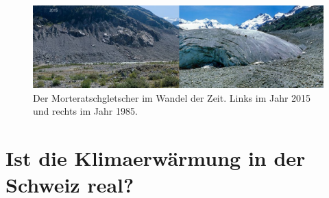 \begin{refsection}
\begin{figure}[htbp]
\centering
\includegraphics[width=1.0\textwidth]{extrem/Morteratsch.jpg}
\caption{Der Morteratschgletscher im Wandel der Zeit. Links im Jahr 2015 und rechts im Jahr 1985.}
\label{Morteratsch}
\end{figure}




\section{Ist die Klimaerwärmung in der Schweiz real?}








\printbibliography[heading=subbibliography]
\end{refsection}
